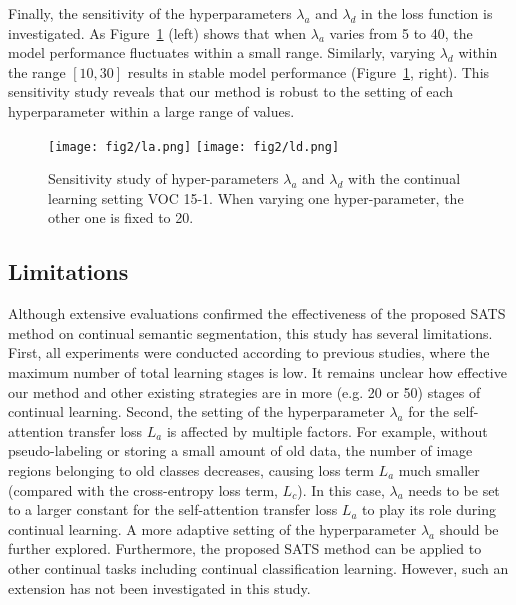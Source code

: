 \documentclass[onecolumn,conference,compsoc]{IEEEtran}
\begin{document}
\begin{spacing}{1.5}
\begin{table*}[t]
\label{tab:ablation2}
\end{table*}

Finally, the sensitivity of the hyperparameters $\lambda_a$ and $\lambda_d$ in the loss function {is investigated.} As Figure~\ref{fig:hyper-param-curve} (left) shows that when $\lambda_a$ varies from 5 to 40, the model performance fluctuates within a small range. Similarly, varying $\lambda_d$ within the range $[10, 30]$ results in stable model performance (Figure~\ref{fig:hyper-param-curve}, right). This sensitivity study {reveals} that our method is robust to the setting of each hyperparameter within a large range of values.




\begin{figure}[h]
  \centering
\texttt{[image: fig2/la.png]}
  \texttt{[image: fig2/ld.png]}
  \vspace{-0.2cm}
    \caption{Sensitivity study of hyper-parameters  $\lambda_a$ and $\lambda_d$ with the continual learning setting VOC 15-1. When varying one hyper-parameter, the other one is fixed to 20. 
  }
  \label{fig:hyper-param-curve}
\end{figure}

\subsection{Limitations}

Although extensive evaluations confirmed the effectiveness of the proposed SATS method on continual semantic segmentation, this study {has several limitations.} First, all experiments {were conducted according to} previous studies, where the maximum number of total learning stages {is} low.  It remains unclear 
how effective our method and other existing strategies are in more (e.g. 20 or 50) stages of continual learning. Second, the setting of the hyperparameter $\lambda_a$ for the self-attention transfer loss ${L}_a$ is affected by multiple factors. For example, without pseudo-labeling or storing a small amount of old data, the number of image regions belonging to old classes {decreases,} causing loss term ${L}_a$ much smaller (compared with the cross-entropy loss term, ${L}_c$). In this case, $\lambda_a$ needs to be set to a larger constant for the self-attention transfer loss ${L}_a$ to play its role during continual learning. A more adaptive setting of the hyperparameter $\lambda_a$ should be further explored. {Furthermore,} the proposed SATS method can be applied to other continual tasks including continual classification learning. {However, such an} extension has not been investigated in this study.


\end{spacing}
\end{document}
